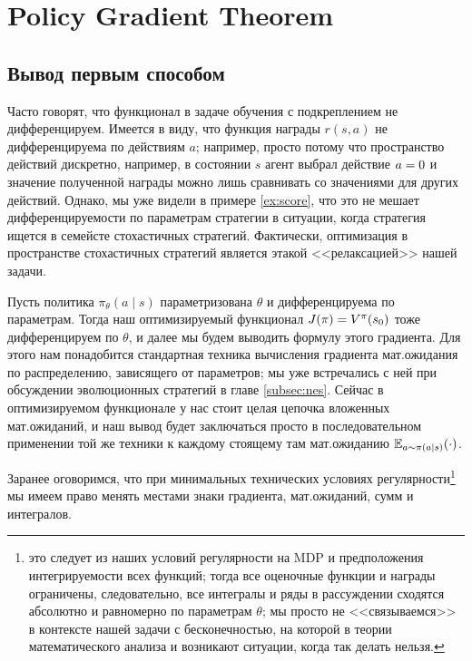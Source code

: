 \section{Policy Gradient Theorem}\label{PGTsection}

\subsection{Вывод первым способом}

Часто говорят, что функционал в задаче обучения с подкреплением не дифференцируем. Имеется в виду, что функция награды $r(s, a)$ не дифференцируема по действиям $a$; например, просто потому что пространство действий дискретно, например, в состоянии $s$ агент выбрал действие $a \HM = 0$ и значение полученной награды можно лишь сравнивать со значениями для других действий. Однако, мы уже видели в примере \ref{ex:score}, что это не мешает дифференцируемости по параметрам стратегии в ситуации, когда стратегия ищется в семейсте стохастичных стратегий. Фактически, оптимизация в пространстве стохастичных стратегий является этакой <<релаксацией>> нашей задачи.

Пусть политика $\pi_{\theta}(a \mid s)$ параметризована $\theta$ и дифференцируема по параметрам. Тогда наш оптимизируемый функционал $J(\pi) \HM= V^\pi(s_0)$ тоже дифференцируем по $\theta$, и далее мы будем выводить формулу этого градиента. Для этого нам понадобится стандартная техника вычисления градиента мат.ожидания по распределению, зависящего от параметров; мы уже встречались с ней при обсуждении эволюционных стратегий в главе \ref{subsec:nes}. Сейчас в оптимизируемом функционале у нас стоит целая цепочка вложенных мат.ожиданий, и наш вывод будет заключаться просто в последовательном применении той же техники к каждому стоящему там мат.ожиданию $\mathbb{E}_{a \sim \pi(a \mid s)} ( \cdot )$.

Заранее оговоримся, что при минимальных технических условиях регулярности\footnote{это следует из наших условий регулярности на MDP и предположения интегрируемости всех функций; тогда все оценочные функции и награды ограничены, следовательно, все интегралы и ряды в рассуждении сходятся абсолютно и равномерно по параметрам $\theta$; мы просто не <<связываемся>> в контексте нашей задачи с бесконечностью, на которой в теории математического анализа и возникают ситуации, когда так делать нельзя.} мы имеем право менять местами знаки градиента, мат.ожиданий, сумм и интегралов.

